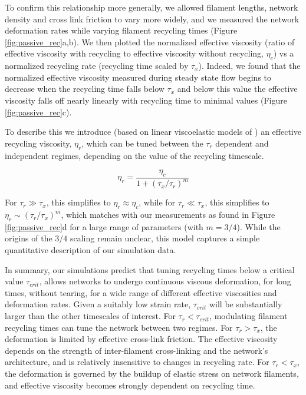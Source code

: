 \documentclass[10pt,letterpaper]{article}
\begin{document}
To confirm this relationship more generally, we allowed filament lengths, network density and cross link friction to vary more widely, and we measured the network deformation rates while varying filament recycling times (Figure \ref{fig:passive_rec}a,b). We then plotted the normalized effective viscosity (ratio of effective viscosity with recycling to effective viscosity without recycling, $\eta_c$) vs a normalized recycling rate (recycling time scaled by $\tau_x$). Indeed, we found that the normalized effective viscosity measured during steady state flow begins to decrease when the recycling time falls below $\tau_x$ and below this value the effective viscosity falls off nearly linearly with recycling time to minimal values (Figure \ref{fig:passive_rec}c). 

To describe this we introduce (based on linear viscoelastic models of \cite{mccrum1997principles}) an effective recycling viscosity, $\eta_r$, which can be tuned between the $\tau_r$ dependent and independent regimes, depending on the value of the recycling timescale.



\begin{equation}
\label{eqn:simple_eta}
\eta_r = \frac{\eta_c}{1+(\tau_x/\tau_r)^m}  
\end{equation}

For $\tau_r\gg\tau_x$, this simplifies to $\eta_r\approx\eta_c$, while for $\tau_r\ll\tau_x$, this simplifies to $\eta_r\sim(\tau_r/\tau_x)^m$, which matches with our measurements as found in Figure \ref{fig:passive_rec}d for a large range of parameters (with $m=3/4$). While the origins of the $3/4$ scaling remain unclear, this model captures a simple quantitative description of our simulation data.



In summary, our simulations predict that tuning recycling times below a critical value $\tau_{crit}$, allows networks to undergo continuous viscous deformation, for long times, without tearing, for a wide range of different effective viscosities and deformation rates. Given a suitably low strain rate, $\tau_{crit}$ will be substantially larger than the other timescales of interest. For $\tau_r < \tau_{crit}$, modulating filament recycling times can tune the network between two regimes. For $\tau_r > \tau_x$, the deformation is limited by effective cross-link friction. The effective viscosity depends on the strength of inter-filament cross-linking and the network's architecture, and is relatively insensitive to changes in recycling rate. For $\tau_r < \tau_x$, the deformation is governed by the buildup of elastic stress on network filaments, and effective viscosity becomes strongly dependent on recycling time. 
\end{document}
